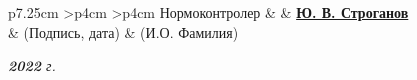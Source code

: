 \begin{titlepage}
\begin{table}[h!]
		\vspace{\baselineskip}

		\begin{signstabular}[0.7]{p{7.25cm} >{\centering\arraybackslash}p{4cm} >{\centering\arraybackslash}p{4cm}}
			Нормоконтролер & \uline{\mbox{\hspace*{4cm}}} & \uline{\hfill \textbf{Ю. В. Строганов} \hfill} \\
			& \scriptsize (Подпись, дата) & \scriptsize (И.О. Фамилия)
		\end{signstabular}
	\end{table}

	\vfill

	\begin{center}
		\normalsize \textit{\textbf{2022} г.}
	\end{center}
\end{titlepage}
